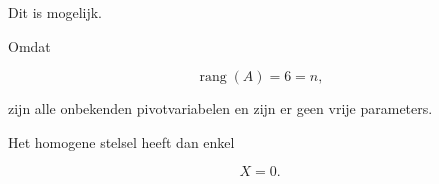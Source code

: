 \documentclass{ximera}
\begin{document}
\begin{oefening}{\oefG}
\begin{question}
\begin{oplossing}

Dit is mogelijk.

Omdat

\[
\operatorname{rang}(A)=6=n,
\]

zijn alle onbekenden pivotvariabelen en zijn er geen vrije parameters.

Het homogene stelsel heeft dan enkel

\[
X=0.
\]

\end{oplossing}

\end{question}

\end{oefening}



\end{document}
